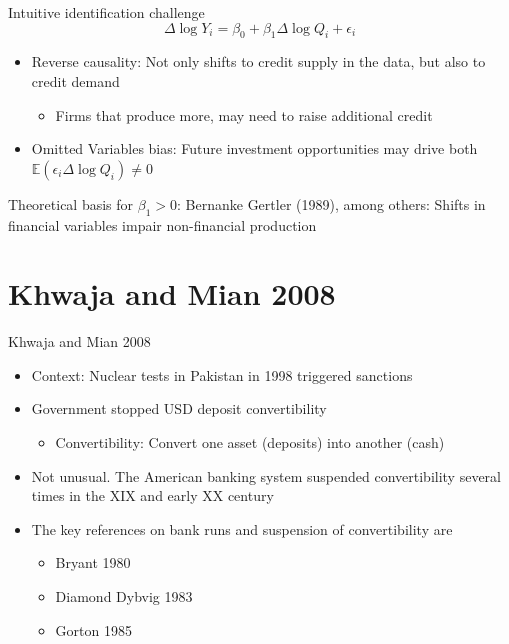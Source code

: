 \documentclass[11pt,aspectratio=169,xcolor={dvipsnames},hyperref={pdftex,pdfpagemode=UseNone,hidelinks,pdfdisplaydoctitle=true},usepdftitle=false]{beamer}
\begin{document}
\begin{frame}{Intuitive identification challenge}
\[\Delta \log Y_i = \beta_0 + \beta_1 \Delta \log Q_i + \epsilon_i\]
\begin{itemize}
\item Reverse causality: Not only shifts to credit supply in the data, but also to credit demand
\begin{itemize}
\item Firms that produce more, may need to raise additional credit
\end{itemize}
\item Omitted Variables bias: Future investment opportunities may drive both $\mathbb{E}(\epsilon_i \Delta \log Q_i) \neq 0$
\end{itemize}
Theoretical basis for $\beta_1 > 0$: Bernanke Gertler (1989), among others: Shifts in financial variables impair non-financial production
\end{frame}

\section{Khwaja and Mian 2008}
\begin{frame}{Khwaja and Mian 2008}
\begin{itemize}
\item Context: Nuclear tests in Pakistan in 1998 triggered sanctions
\item Government stopped USD deposit convertibility
\begin{itemize}
\item Convertibility: Convert one asset (deposits) into another (cash)
\end{itemize}
\item Not unusual. The American banking system suspended convertibility several times in the XIX and early XX century
\item The key references on bank runs and suspension of convertibility are
\begin{itemize}
\item Bryant 1980
\item Diamond Dybvig 1983
\item Gorton 1985
\end{itemize}
\end{itemize}
\end{frame}
\end{document}
